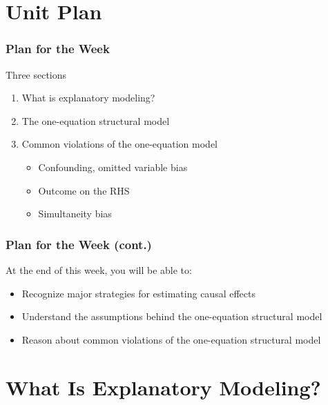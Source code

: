 \documentclass[12pt, block=fill]{beamer}
\begin{document}
\begin{frame}

\end{frame}



\section{Unit Plan}

\begin{frame}
  \frametitle{Plan for the Week}
  Three sections
  \begin{enumerate}
  \item What is explanatory modeling?
  \item The one-equation structural model
  \item Common violations of the one-equation model
  \begin{itemize}
\item Confounding, omitted variable bias
\item Outcome on the RHS
\item Simultaneity bias
\end{itemize}

\end{enumerate}

  \note[item]{}
\end{frame}

\begin{frame}
  \frametitle{Plan for the Week (cont.)}
  At the end of this week, you will be able to:
  \begin{itemize}
  \item Recognize major strategies for estimating causal effects
  \item Understand the assumptions behind the one-equation structural model
  \item Reason about common violations of the one-equation structural model
  \end{itemize}
\end{frame}

\section{What Is Explanatory Modeling?}
\end{document}

